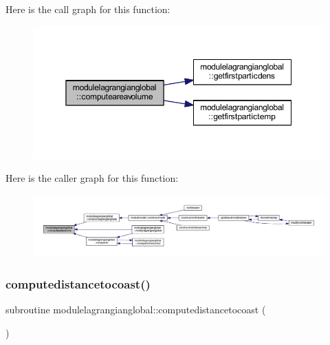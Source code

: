 Here is the call graph for this function\+:\nopagebreak
\begin{figure}[H]
\begin{center}
\leavevmode
\includegraphics[width=350pt]{namespacemodulelagrangianglobal_ad6190c60927cd9e871e45fcfd4fc5dd2_cgraph}
\end{center}
\end{figure}
Here is the caller graph for this function\+:\nopagebreak
\begin{figure}[H]
\begin{center}
\leavevmode
\includegraphics[width=350pt]{namespacemodulelagrangianglobal_ad6190c60927cd9e871e45fcfd4fc5dd2_icgraph}
\end{center}
\end{figure}
\mbox{\label{namespacemodulelagrangianglobal_ae26f6cb369947b236a6e8dffcbed3eb2}} 
\subsubsection{\texorpdfstring{computedistancetocoast()}{computedistancetocoast()}}
{\footnotesize\ttfamily subroutine modulelagrangianglobal\+::computedistancetocoast (\begin{DoxyParamCaption}{ }\end{DoxyParamCaption})\hspace{0.3cm}{\ttfamily [private]}}

